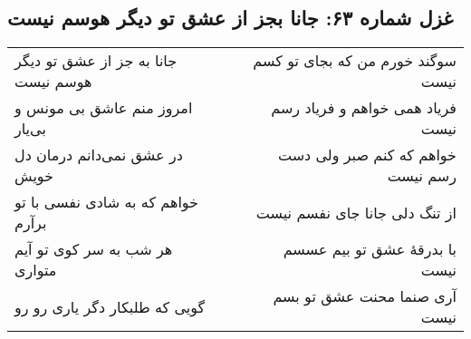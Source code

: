 \begin{center}
\section*{غزل شماره ۶۳: جانا بجز از عشق تو دیگر هوسم نیست}
\label{sec:063}
\begin{longtable}{l p{0.5cm} r}
جانا به جز از عشق تو دیگر هوسم نیست
&&
سوگند خورم من که بجای تو کسم نیست
\\
امروز منم عاشق بی مونس و بی‌یار
&&
فریاد همی خواهم و فریاد رسم نیست
\\
در عشق نمی‌دانم درمان دل خویش
&&
خواهم که کنم صبر ولی دست رسم نیست
\\
خواهم که به شادی نفسی با تو برآرم
&&
از تنگ دلی جانا جای نفسم نیست
\\
هر شب به سر کوی تو آیم متواری
&&
با بدرقهٔ عشق تو بیم عسسم نیست
\\
گویی که طلبکار دگر یاری رو رو
&&
آری صنما محنت عشق تو بسم نیست
\\
\end{longtable}
\end{center}
